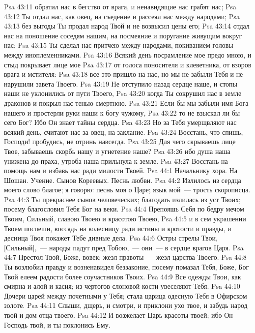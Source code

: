 \vs Psa 43:11 обратил нас в бегство от врага, и ненавидящие нас грабят нас;
\vs Psa 43:12 Ты отдал нас, как овец, на съедение и рассеял нас между народами;
\vs Psa 43:13 без выгоды Ты продал народ Твой и не возвысил цены его;
\vs Psa 43:14 отдал нас на поношение соседям нашим, на посмеяние и поругание живущим вокруг нас;
\vs Psa 43:15 Ты сделал нас притчею между народами, покиванием головы между иноплеменниками.
\vs Psa 43:16 Всякий день посрамление мое предо мною, и стыд покрывает лице мое
\vs Psa 43:17 от голоса поносителя и клеветника, от взоров врага и мстителя:
\vs Psa 43:18 все это пришло на нас, но мы не забыли Тебя и не нарушили завета Твоего.
\vs Psa 43:19 Не отступило назад сердце наше, и стопы наши не уклонились от пути Твоего,
\vs Psa 43:20 когда Ты сокрушил нас в земле драконов и покрыл нас тенью смертною.
\vs Psa 43:21 Если бы мы забыли имя Бога нашего и простерли руки наши к богу чужому,
\vs Psa 43:22 то не взыскал ли бы сего Бог? Ибо Он знает тайны сердца.
\vs Psa 43:23 Но за Тебя умерщвляют нас всякий день, считают нас за овец,  на заклание.
\vs Psa 43:24 Восстань, что спишь, Господи! пробудись, не отринь навсегда.
\vs Psa 43:25 Для чего скрываешь лице Твое, забываешь скорбь нашу и угнетение наше?
\vs Psa 43:26 ибо душа наша унижена до праха, утроба наша прильнула к земле.
\vs Psa 43:27 Восстань на помощь нам и избавь нас ради милости Твоей.
\vs Psa 44:1 Начальнику хора. На  Шошан. Учение. Сынов Кореевых. Песнь любви.
\rsbpar\vs Psa 44:2 Излилось из сердца моего слово благое; я говорю: песнь моя о Царе; язык мой~--- трость скорописца.
\vs Psa 44:3 Ты прекраснее сынов человеческих; благодать излилась из уст Твоих; посему благословил Тебя Бог на веки.
\vs Psa 44:4 Препояшь Себя по бедру мечом Твоим, Сильный, славою Твоею и красотою Твоею,
\vs Psa 44:5 и в сем украшении Твоем поспеши, воссядь на колесницу ради истины и кротости и правды, и десница Твоя покажет Тебе дивные дела.
\vs Psa 44:6 Остры стрелы Твои, [Сильный],~--- народы падут пред Тобою,~--- они~--- в сердце врагов Царя.
\vs Psa 44:7 Престол Твой, Боже, вовек; жезл правоты~--- жезл царства Твоего.
\vs Psa 44:8 Ты возлюбил правду и возненавидел беззаконие, посему помазал Тебя, Боже, Бог Твой елеем радости более соучастников Твоих.
\vs Psa 44:9 Все одежды Твои, как смирна и алой и касия; из чертогов слоновой кости увеселяют Тебя.
\vs Psa 44:10 Дочери царей между почетными у Тебя; стала царица одесную Тебя в Офирском золоте.
\vs Psa 44:11 Слыши, дщерь, и смотри, и приклони ухо твое, и забудь народ твой и дом отца твоего.
\vs Psa 44:12 И возжелает Царь красоты твоей; ибо Он Господь твой, и ты поклонись Ему.
